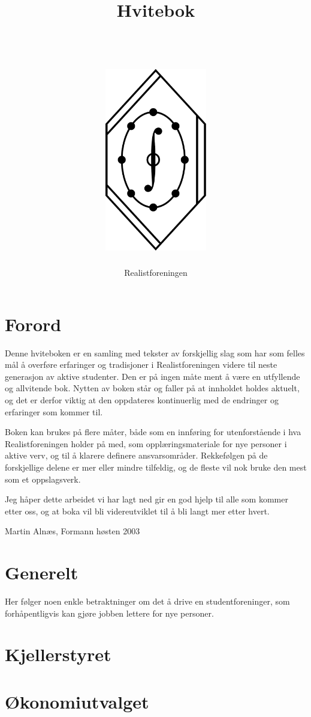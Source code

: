 \documentclass[11pt,norsk,a4paper,pointlessnumbers]{scrbook}
\title{Hvitebok\\
       \quad \\
       \quad \\
       \includegraphics[height=8cm]{rflogo} }
\author{Realistforeningen}
\begin{document}
\frontmatter

\maketitle{}
\tableofcontents{}


\chapter{Forord}
Denne hviteboken er en samling med tekster av forskjellig slag som har
som felles mål å overføre erfaringer og tradisjoner i Realistforeningen
videre til neste generasjon av aktive studenter. Den er på ingen måte
ment å være en utfyllende og allvitende bok. Nytten av boken står og
faller på at innholdet holdes aktuelt, og det er derfor viktig at den
oppdateres kontinuerlig med de endringer og erfaringer som kommer til.

Boken kan brukes på flere måter, både som en innføring for utenforstående
i hva Realistforeningen holder på med, som opplæringsmateriale for nye
personer i aktive verv, og til å klarere definere ansvarsområder.
Rekkefølgen på de forskjellige delene er mer eller mindre tilfeldig,
og de fleste vil nok bruke den mest som et oppslagsverk.

Jeg håper dette arbeidet vi har lagt ned gir en god hjelp til alle
som kommer etter oss, og at boka vil bli videreutviklet til å bli
langt mer etter hvert.

Martin Alnæs, Formann høsten 2003


\mainmatter

\chapter{Generelt}
Her følger noen enkle betraktninger om det å drive en studentforeninger,
som forhåpentligvis kan gjøre jobben lettere for nye personer.




\chapter{Kjellerstyret}




\chapter{Økonomiutvalget}

\end{document}
